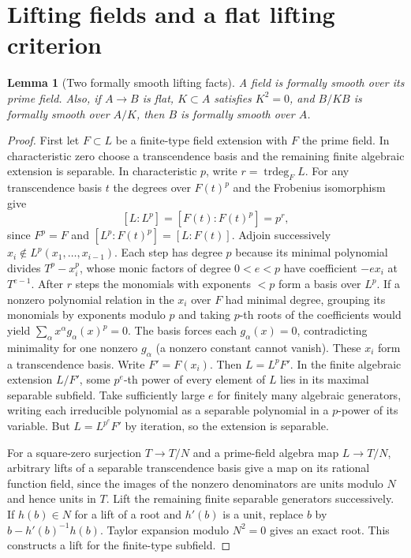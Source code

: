 \documentclass[11pt,oneside,openany]{book}
\newtheorem{lemma}[theorem]{Lemma}
\theoremstyle{definition}
\theoremstyle{remark}
\begin{document}
\section{Lifting fields and a flat lifting criterion}

\begin{lemma}[Two formally smooth lifting facts]\label{res:C01}
A field is formally smooth over its prime field. Also, if
\(A\to B\) is flat, \(K\subset A\) satisfies \(K^2=0\), and
\(B/KB\) is formally smooth over \(A/K\), then \(B\) is formally
smooth over \(A\).
\end{lemma}
\begin{proof}
First let \(F\subset L\) be a finite-type field extension with \(F\)
the prime field. In characteristic zero choose a transcendence basis
and the remaining finite algebraic extension is separable. In
characteristic \(p\), write \(r=\operatorname{trdeg}_F L\).
For any transcendence basis \(t\) the degrees over \(F(t)^p\)
and the Frobenius isomorphism give
\[
 [L:L^p]=[F(t):F(t)^p]=p^r,
\]
since \(F^p=F\) and \([L^p:F(t)^p]=[L:F(t)]\). Adjoin successively
\(x_i\notin L^p(x_1,\ldots,x_{i-1})\). Each step has degree \(p\) because
its minimal polynomial divides \(T^p-x_i^p\), whose monic factors of
degree \(0<e<p\) have coefficient \(-e x_i\) at \(T^{e-1}\).
After \(r\) steps the monomials with exponents \(<p\) form a basis
over \(L^p\). If a nonzero polynomial relation in the \(x_i\) over
\(F\) had minimal degree, grouping its monomials by exponents modulo
\(p\) and taking \(p\)-th roots of the coefficients would yield
\(\sum_\alpha x^\alpha g_\alpha(x)^p=0\).
The basis forces each \(g_\alpha(x)=0\), contradicting minimality for
one nonzero \(g_\alpha\) (a nonzero constant cannot vanish).
These \(x_i\) form a transcendence basis. Write \(F'=F(x_i)\).
Then \(L=L^pF'\). In the finite algebraic extension \(L/F'\), some
\(p^e\)-th power of every element of \(L\) lies in its maximal separable
subfield. Take sufficiently large \(e\) for finitely many algebraic
generators, writing each irreducible polynomial as a separable
polynomial in a \(p\)-power of its variable. But \(L=L^{p^e}F'\) by
iteration, so the extension is separable.

For a square-zero surjection \(T\to T/N\) and a prime-field algebra
map \(L\to T/N\), arbitrary lifts of a separable transcendence basis
give a map on its rational function field, since the images of the
nonzero denominators are units modulo \(N\) and hence units in \(T\).
Lift the remaining finite separable generators successively. If
\(h(b)\in N\) for a lift of a root and \(h'(b)\) is a unit,
replace \(b\) by \(b-h'(b)^{-1}h(b)\). Taylor expansion modulo
\(N^2=0\) gives an exact root. This constructs a lift for the
finite-type subfield.


\end{proof}
\end{document}
